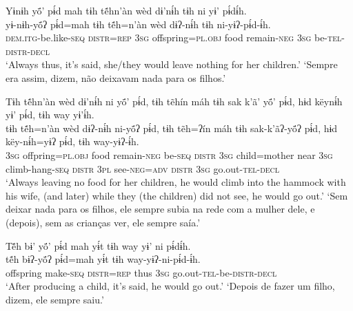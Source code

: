 \documentclass[output=paper,
modfonts,nonflat
]{langsci/langscibook}
\begin{document}
\ea  Yɨnɨh yö́’ pɨ́d mah tɨh tẽ́hn’àn wèd dɨ’nɨ́h tɨh ni yɨ’ pɨ́dɨ́h.\\ 
\gll yɨ-nɨh-yö́ʔ pɨ́d=mah tɨh tẽ́h=n’àn wèd dɨʔ-nɨ́h tɨh ni-yɨʔ-pɨ́d-ɨ́h.\\
     \textsc{dem.itg-}be.like\textsc{-seq} \textsc{distr=rep} \textsc{3sg} offspring\textsc{=pl.obj} food remain\textsc{-neg} \textsc{3sg} be\textsc{-tel-distr-decl}\\
\glt ‘Always thus, it’s said, she/they would leave nothing for her children.'
\glt ‘Sempre era assim, dizem, não deixavam nada para os filhos.'
\z 

\newpage
\ea  Tɨh tẽ́hn’àn wèd dɨ’nɨ́h ni yö́’ pɨ́d, tɨh tẽhín máh tɨh sak k’ã’ yö́’ pɨ́d, hɨd këynɨ́h yɨ’ pɨ́d, tɨh way yɨ’ɨ́h.\\ 
\gll tɨh tẽ́h=n’àn wèd dɨʔ-nɨ́h ni-yö́ʔ pɨ́d, tɨh tẽh=ʔín máh tɨh sak-k’ãʔ-yö́ʔ pɨ́d, hɨd këy-nɨ́h=yɨʔ pɨ́d, tɨh way-yɨʔ-ɨ́h.\\
     \textsc{3sg} offpring\textsc{=pl.obj} food remain\textsc{-neg} be\textsc{-seq} \textsc{distr} \textsc{3sg} child=mother near \textsc{3sg} climb-hang\textsc{-seq} \textsc{distr} \textsc{3pl} see\textsc{-neg=adv} \textsc{distr} \textsc{3sg} go.out\textsc{-tel-decl}\\
\glt ‘Always leaving no food for her children, he would climb into the hammock with his wife, (and later) while they (the children) did not see, he would go out.'
\glt ‘Sem deixar nada para os filhos, ele sempre subia na rede com a mulher dele, e (depois), sem as crianças ver, ele sempre saía.'
\z 

\ea  Tẽ́h bɨ’ yö́’ pɨ́d mah yɨ́t tɨh way yɨ’ ni pɨ́dɨ́h.\\ 
\gll tẽ́h bɨʔ-yö́ʔ pɨ́d=mah yɨ́t tɨh way-yɨʔ-ni-pɨ́d-ɨ́h.\\
     offspring make\textsc{-seq} \textsc{distr=rep} thus \textsc{3sg} go.out\textsc{-tel-}be\textsc{-distr-decl}\\
\glt ‘After producing a child,{\footnotemark} it’s said, he would go out.'
\glt ‘Depois de fazer um filho, dizem, ele sempre saiu.'
\z 
\end{document}
